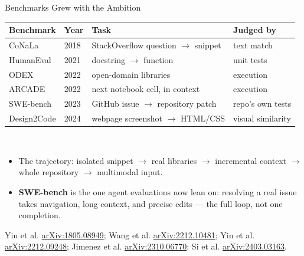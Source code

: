 \begin{frame}{Benchmarks Grew with the Ambition}
  \centering
  {\footnotesize
  \begin{tabular}{llll}
    \toprule
    Benchmark & Year & Task & Judged by \\
    \midrule
    CoNaLa & 2018 & StackOverflow question $\rightarrow$ snippet & text match \\
    HumanEval & 2021 & docstring $\rightarrow$ function & unit tests \\
    ODEX & 2022 & open-domain libraries & execution \\
    ARCADE & 2022 & next notebook cell, in context & execution \\
    SWE-bench & 2023 & GitHub issue $\rightarrow$ repository patch & repo's own tests \\
    Design2Code & 2024 & webpage screenshot $\rightarrow$ HTML/CSS & visual similarity \\
    \bottomrule
  \end{tabular}}\\[0.7em]
  \begin{itemize}\itemsep0.3em
    \item[\textcolor{red}{$\triangleright$}] The trajectory: isolated snippet $\rightarrow$ real libraries
      $\rightarrow$ incremental context $\rightarrow$ whole repository $\rightarrow$ multimodal input.
    \item[\textcolor{red}{$\triangleright$}] \textbf{SWE-bench} is the one agent evaluations now lean on:
      resolving a real issue takes navigation, long context, and precise edits --- the full loop, not one
      completion.
  \end{itemize}
  \vspace{0.2em}
  {\scriptsize Yin et al. \href{https://arxiv.org/abs/1805.08949}{arXiv:1805.08949}; Wang et al.
  \href{https://arxiv.org/abs/2212.10481}{arXiv:2212.10481}; Yin et al.
  \href{https://arxiv.org/abs/2212.09248}{arXiv:2212.09248}; Jimenez et al.
  \href{https://arxiv.org/abs/2310.06770}{arXiv:2310.06770}; Si et al.
  \href{https://arxiv.org/abs/2403.03163}{arXiv:2403.03163}.}
\end{frame}

